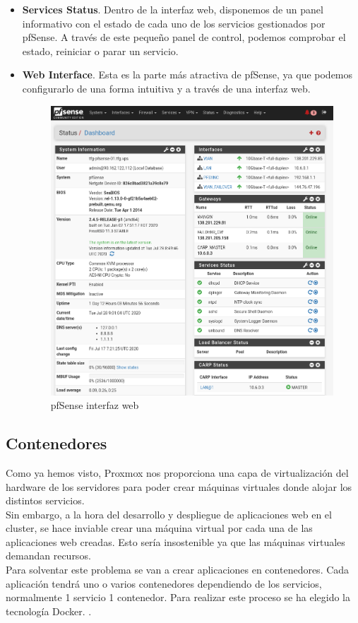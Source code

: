 \begin{paragraph}
\begin{itemize}
					\item \textbf{Services Status}. Dentro de la interfaz web, disponemos de un panel informativo con el estado de cada uno de los servicios gestionados por pfSense. A través de este pequeño panel de control, podemos comprobar el estado, reiniciar o parar un servicio.
					\item \textbf{Web Interface}. Esta es la parte más atractiva de pfSense, ya que podemos configurarlo de una forma intuitiva y a través de una interfaz web.
					\begin{figure}[!hbt]
						\centering
						\includegraphics[scale=0.3]{imagenes/Diseno/pfsense_wui.png}
						\caption[pfSense interfaz web]{pfSense interfaz web} 
						\label{pfsense_wui}
					\end{figure}
				\end{itemize}
			\end{paragraph}
		\clearpage
	\subsection{Contenedores}
		\begin{paragraph}
			Como ya hemos visto, Proxmox nos proporciona una capa de virtualización del hardware de los servidores para poder crear máquinas virtuales donde alojar los distintos servicios. \\
			Sin embargo, a la hora del desarrollo y despliegue de aplicaciones web en el cluster, se hace inviable crear una máquina virtual por cada una de las aplicaciones web creadas. Esto sería insostenible ya que las máquinas virtuales demandan recursos. \\
			
			Para solventar este problema se van a crear aplicaciones en contenedores. Cada aplicación tendrá uno o varios contenedores dependiendo de los servicios, normalmente 1 servicio 1 contenedor. Para realizar este proceso se ha elegido la tecnología Docker. \cite{docker:online}.
		\end{paragraph}
